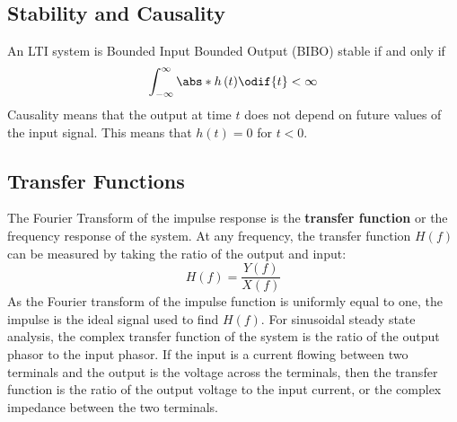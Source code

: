 \documentclass{article}
\begin{document}
\subsection{Stability and Causality}
An LTI system is Bounded Input Bounded Output (BIBO) stable if and only
if
\begin{equation*}
    \int_{-\infty}^\infty \abs*{h\left( t \right)} \odif{t} < \infty
\end{equation*}
Causality means that the output at time \(t\) does not depend on future
values of the input signal. This means that \(h\left( t \right) = 0\)
for \(t < 0\).
\subsection{Transfer Functions}
The Fourier Transform of the impulse response is the \textbf{transfer
function} or the frequency response of the system. At any frequency,
the transfer function \(H\left( f \right)\) can be measured by taking
the ratio of the output and input:
\begin{equation*}
    H\left( f \right) = \frac{Y\left( f \right)}{X\left( f \right)}
\end{equation*}
As the Fourier transform of the impulse function is uniformly equal to
one, the impulse is the ideal signal used to find \(H\left( f \right)\).
For sinusoidal steady state analysis, the complex transfer function of
the system is the ratio of the output phasor to the input phasor.
If the input is a current flowing between two terminals and the output
is the voltage across the terminals, then the transfer function is the
ratio of the output voltage to the input current, or the complex
impedance between the two terminals.
\end{document}
